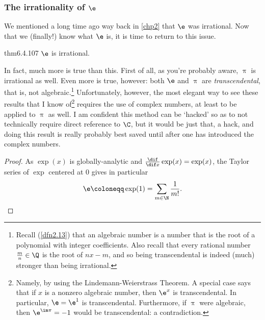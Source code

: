 \subsubsection{The irrationality of \texorpdfstring{$\e$}{e}}

We mentioned a long time ago way back in \cref{chp2} that $\e$ was irrational.  Now that we (finally!) know what $\e$ is, it is time to return to this issue.
\begin{thm}{}{thm6.4.107}
$\e$ is irrational.
\begin{rmk}
In fact, much more is true than this.  First of all, as you're probably aware, $\uppi$ is irrational as well.  Even more is true, however:  both $\e$ and $\uppi$ are \emph{transcendental}, that is, not algebraic.\footnote{Recall (\cref{dfn2.13}) that an algebraic number is a number that is the root of a polynomial with integer coefficients.  Also recall that every rational number $\frac{m}{n}\in \Q$ is the root of $nx-m$, and so being transcendental is indeed (much) stronger than being irrational.}  Unfortunately, however, the most elegant way to see these results that I know of\footnote{Namely, by using the Lindemann-Weierstrass Theorem.  A special case says that if $x$ is a nonzero algebraic number, then $\e ^x$ is transcendental.  In particular, $\e =\e ^1$ is transcendental.  Furthermore, if $\uppi$ were algebraic, then $\e ^{\im \pi}=-1$ would be transcendental:  a contradiction.} requires the use of complex numbers, at least to be applied to $\uppi$ as well.  I am confident this method can be `hacked' so as to not technically require direct reference to $\C$, but it would be just that, a hack, and doing this result is really probably best saved until after one has introduced the complex numbers.
\end{rmk}
\begin{proof}
As $\exp (x)$ is globally-analytic and $\frac{\dif}{\dif x}\exp (x)=\exp (x)$, the Taylor series of $\exp$ centered at $0$ gives in particular
\begin{equation}
\e \coloneqq \exp (1)=\sum _{m\in \N}\frac{1}{m!}.
\end{equation}


\end{proof}
\end{thm}
